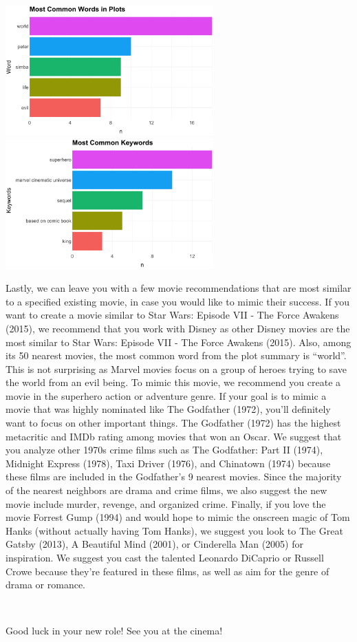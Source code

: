 \documentclass[10pt]{article}
\begin{document}
\begin{center}
\includegraphics[width=8cm]{_assets/_assets_knn/star_wars_common_words.png}
\hspace{1cm}
\includegraphics[width=8cm]{_assets/_assets_knn/star_wars_common_keywords.png}

\end{center}

\quad Lastly, we can leave you with a few movie recommendations that are most similar to a specified existing movie, in case you would like to mimic their success. If you want to create a movie similar to Star Wars: Episode VII - The Force Awakens (2015), we recommend that you work with Disney as other Disney movies are the most similar to Star Wars: Episode VII - The Force Awakens (2015). Also, among its 50 nearest movies, the most common word from the plot summary is “world”. This is not surprising as Marvel movies focus on a group of heroes trying to save the world from an evil being. To mimic this movie, we recommend you create a movie in the superhero action or adventure genre. If your goal is to mimic a movie that was highly nominated like The Godfather (1972), you’ll definitely want to focus on other important things. The Godfather (1972) has the highest metacritic and IMDb rating among movies that won an Oscar. We suggest that you analyze other 1970s crime films such as The Godfather: Part II (1974), Midnight Express (1978), Taxi Driver (1976), and Chinatown (1974) because these films are included in the Godfather’s 9 nearest movies. Since the majority of the nearest neighbors are drama and crime films, we also suggest the new movie include murder, revenge, and organized crime. Finally, if you love the movie Forrest Gump (1994) and would hope to mimic the onscreen magic of Tom Hanks (without actually having Tom Hanks), we suggest you look to The Great Gatsby (2013), A Beautiful Mind (2001), or Cinderella Man (2005) for inspiration. We suggest you cast the talented Leonardo DiCaprio or Russell Crowe because they’re featured in these films, as well as aim for the genre of drama or romance. 

\ 

Good luck in your new role! See you at the cinema!

 
\end{document}
